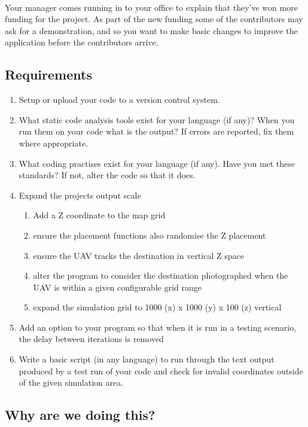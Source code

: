\documentclass[11pt]{book}
\begin{document}
\paragraph{} Your manager comes running in to your office to explain that they've won more funding for the project. As part of the new funding some of the contributors may ask for a demonstration, and so you want to make basic changes to improve the application before the contributors arrive.

\subsection{Requirements}

\begin{enumerate}
\item Setup or upload your code to a version control system.
\item What static code analysis tools exist for your language (if any)? When you run them on your code what is the output? If errors are reported, fix them where appropriate.
\item What coding practises exist for your language (if any). Have you met these standards? If not, alter the code so that it does.
\item Expand the projects output scale
    \begin{enumerate}
        \item Add a Z coordinate to the map grid
        \item ensure the placement functions also randomise the Z placement
        \item ensure the UAV tracks the destination in vertical Z space
        \item alter the program to consider the destination photographed when the UAV is within a given configurable grid range
        \item expand the simulation grid to 1000 (x) x 1000 (y) x 100 (z) vertical
    \end{enumerate}
\item Add an option to your program so that when it is run in a testing scenario, the delay between iterations is removed
\item Write a basic script (in any language) to run through the text output produced by a test run of your code and check for invalid coordinates outside of the given simulation area.
\end{enumerate}

\subsection{Why are we doing this?}
\end{document}
